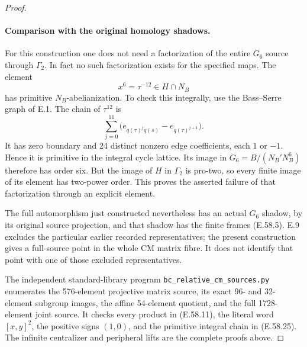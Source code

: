 \begin{proof}
\paragraph{Comparison with the original homology shadows.}
For this construction one does not need a factorization
of the entire \(G_6\) source through \(\Gamma_2\).
In fact no such factorization exists for the specified
maps. The element
\[
              x^6=\tau^{-12}\in H\cap N_B
 \tag{E.58.24}
\]
has primitive \(N_B\)-abelianization. To check this
integrally, use the Bass--Serre graph of E.1. The chain
of \(\tau^{12}\) is
\[
       \sum_{j=0}^{11}
          \bigl(e_{q(\tau)^j q(s)}-e_{q(\tau)^{j+1}}\bigr).
 \tag{E.58.25}
\]
It has zero boundary and 24 distinct nonzero edge
coefficients, each \(1\) or \(-1\). Hence it is
primitive in the integral cycle lattice. Its image
in \(G_6=B/(N_B'N_B^6)\) therefore has order six.
But the image of \(H\) in \(\Gamma_2\) is pro-two,
so every finite image of its element has two-power
order. This proves the asserted failure of that
factorization through an explicit element.

The full automorphism just constructed nevertheless
has an actual \(G_6\) shadow, by its original source
projection, and that shadow has the finite frames
\textup{(E.58.5)}. E.9 excludes the particular earlier
recorded representatives; the present construction
gives a full-source point in the whole CM matrix
fibre. It does not identify that point with one of
those excluded representatives.

The independent standard-library program
\texttt{bc\_relative\_cm\_sources.py} enumerates the
576-element projective matrix source, its exact
96- and 32-element subgroup images, the affine
54-element quotient, and the full 1728-element
joint source. It checks every product in
\textup{(E.58.11)}, the literal word
\([x,y]^2\), the positive signs \((1,0)\), and
the primitive integral chain in
\textup{(E.58.25)}. The infinite centralizer and
peripheral lifts are the complete proofs above.
\end{proof}

